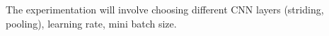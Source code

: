 \documentclass{article}
\begin{document}
The experimentation will involve choosing different CNN layers (striding, pooling), learning rate, mini batch size. 




\medskip

\nocite{*}

\small



\end{document}
